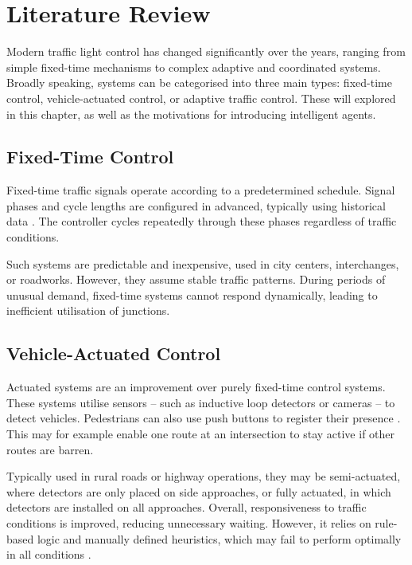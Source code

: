 \documentclass[a4paper]{report}
\begin{document}
\chapter{Literature Review} \label{chapter:literature_review}

Modern traffic light control has changed significantly over the years, ranging from simple fixed-time mechanisms to complex adaptive and coordinated systems. Broadly speaking, systems can be categorised into three main types: fixed-time control, vehicle-actuated control, or adaptive traffic control. These will explored in this chapter, as well as the motivations for introducing intelligent agents.

\section{Fixed-Time Control}

Fixed-time traffic signals operate according to a predetermined schedule. Signal phases and cycle lengths are configured in advanced, typically using historical data \cite{GoelBusGershenson}. The controller cycles repeatedly through these phases regardless of traffic conditions.

Such systems are predictable and inexpensive, used in city centers, interchanges, or roadworks. However, they assume stable traffic patterns. During periods of unusual demand, fixed-time systems cannot respond dynamically, leading to inefficient utilisation of junctions.

\section{Vehicle-Actuated Control}

Actuated systems are an improvement over purely fixed-time control systems. These systems utilise sensors -- such as inductive loop detectors or cameras -- to detect vehicles. Pedestrians can also use push buttons to register their presence \cite{PedestrianCrossings23}. This may for example enable one route at an intersection to stay active if other routes are barren.

Typically used in rural roads or highway operations, they may be semi-actuated, where detectors are only placed on side approaches, or fully actuated, in which detectors are installed on all approaches. Overall, responsiveness to traffic conditions is improved, reducing unnecessary waiting. However, it relies on rule-based logic and manually defined heuristics, which may fail to perform optimally in all conditions \cite{LiPengHouEtAl2023}.
\end{document}
